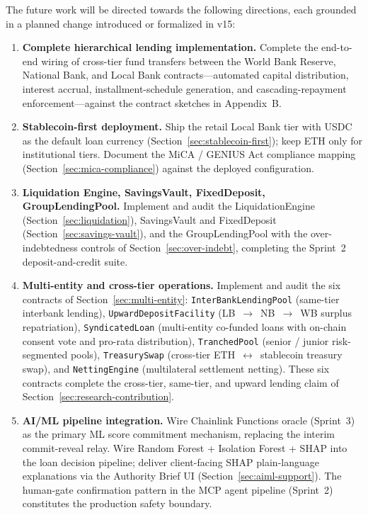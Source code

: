 \documentclass[12pt,a4paper]{report}
\begin{document}
The future work will be directed towards the following directions, each grounded in a planned change introduced or formalized in v15:
\label{sec:future-work}

\begin{enumerate}[noitemsep]
\item \textbf{Complete hierarchical lending implementation.} Complete the end-to-end wiring of cross-tier fund transfers between the World Bank Reserve, National Bank, and Local Bank contracts---automated capital distribution, interest accrual, installment-schedule generation, and cascading-repayment enforcement---against the contract sketches in Appendix~B.
\item \textbf{Stablecoin-first deployment.} Ship the retail Local Bank tier with USDC as the default loan currency (Section~\ref{sec:stablecoin-first}); keep ETH only for institutional tiers. Document the MiCA / GENIUS Act compliance mapping (Section~\ref{sec:mica-compliance}) against the deployed configuration.
\item \textbf{Liquidation Engine, SavingsVault, FixedDeposit, GroupLendingPool.} Implement and audit the LiquidationEngine (Section~\ref{sec:liquidation}), SavingsVault and FixedDeposit (Section~\ref{sec:savings-vault}), and the GroupLendingPool with the over-indebtedness controls of Section~\ref{sec:over-indebt}, completing the Sprint~2 deposit-and-credit suite.
\item \textbf{Multi-entity and cross-tier operations.} Implement and audit the six contracts of Section~\ref{sec:multi-entity}: \texttt{InterBankLendingPool} (same-tier interbank lending), \texttt{UpwardDepositFacility} (LB~$\to$~NB~$\to$~WB surplus repatriation), \texttt{SyndicatedLoan} (multi-entity co-funded loans with on-chain consent vote and pro-rata distribution), \texttt{TranchedPool} (senior / junior risk-segmented pools), \texttt{TreasurySwap} (cross-tier ETH~$\leftrightarrow$~stablecoin treasury swap), and \texttt{NettingEngine} (multilateral settlement netting). These six contracts complete the cross-tier, same-tier, and upward lending claim of Section~\ref{sec:research-contribution}.
\item \textbf{AI/ML pipeline integration.} Wire Chainlink Functions oracle (Sprint~3) as the primary ML score commitment mechanism, replacing the interim commit-reveal relay. Wire Random Forest + Isolation Forest + SHAP into the loan decision pipeline; deliver client-facing SHAP plain-language explanations via the Authority Brief UI (Section~\ref{sec:aiml-support}). The human-gate confirmation pattern in the MCP agent pipeline (Sprint~2) constitutes the production safety boundary.

\end{enumerate}
\end{document}
